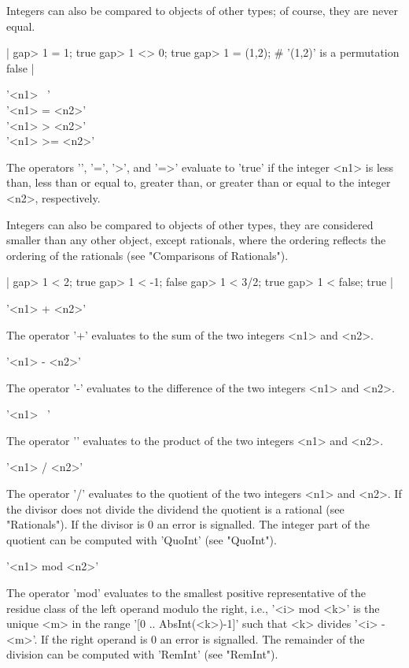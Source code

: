Integers can also be compared to objects  of other types; of course, they
are never equal.

|    gap> 1 = 1;
    true
    gap> 1 <> 0;
    true
    gap> 1 = (1,2);     # '(1,2)' is a permutation
    false |

'<n1> \<\ <n2>' \\
'<n1> \<= <n2>' \\
'<n1> > <n2>' \\
'<n1> >= <n2>'

The  operators  '\<',  '\<=', '>',  and '=>'  evaluate to  'true' if  the
integer <n1> is  less  than,  less  than  or  equal to, greater than,  or
greater than or equal to the integer <n2>, respectively.

Integers  can  also be  compared to  objects  of  other  types, they  are
considered  smaller than any  other object,  except rationals, where  the
ordering  reflects  the  ordering  of the rationals  (see "Comparisons of
Rationals").

|    gap> 1 < 2;
    true
    gap> 1 < -1;
    false
    gap> 1 < 3/2;
    true
    gap> 1 < false;
    true |

%

'<n1> + <n2>'

The operator '+' evaluates to the sum of the two integers <n1> and <n2>.

'<n1> - <n2>'

The operator '-' evaluates to the difference of the two integers <n1> and
<n2>.

'<n1> \*\ <n2>'

The operator '\*' evaluates to the product of  the  two integers <n1> and
<n2>.

'<n1> / <n2>'

The operator '/' evaluates to the quotient of the two  integers  <n1> and
<n2>.  If the   divisor does not  divide  the dividend the  quotient is a
rational (see "Rationals").  If the  divisor is 0  an error is signalled.
The integer  part  of  the quotient can  be  computed with  'QuoInt' (see
"QuoInt").

'<n1> mod <n2>'

The operator 'mod' evaluates  to the smallest positive representative  of
the  residue  class of the left operand modulo  the right, i.e., '<i> mod
<k>' is the unique <m> in the range '[0 ..  AbsInt(<k>)-1]' such that <k>
divides '<i>  - <m>'.  If the right operand is  0 an error  is signalled.
The  remainder of  the  division  can  be  computed  with  'RemInt'  (see
"RemInt").

